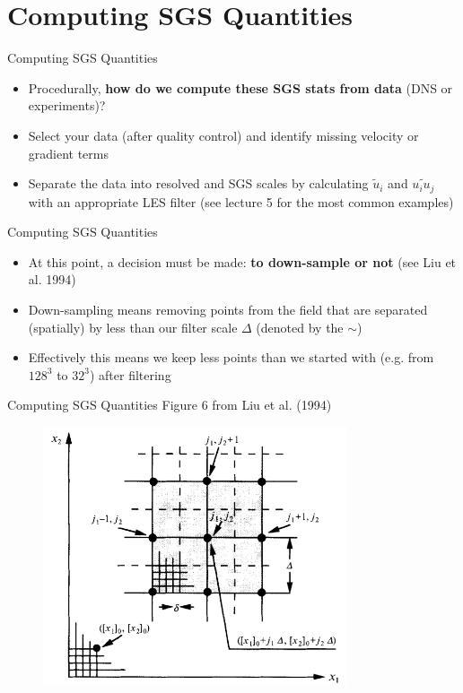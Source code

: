\section{Computing SGS Quantities}
\begin{frame}{Computing SGS Quantities}
\begin{itemize}
	\item Procedurally, \textbf{how do we compute these SGS stats from data} (DNS or experiments)?
	\item  Select your data (after quality control) and identify missing velocity or gradient terms
	\item Separate the data into resolved and SGS scales by calculating $\tilde{u}_i$ and $\widetilde{u_iu_j}$ with an appropriate LES filter (see lecture 5 for the most common examples)
\end{itemize}
\end{frame}
\begin{frame}{Computing SGS Quantities}
\begin{itemize}
	\item At this point, a decision must be made: \textbf{to down-sample or not} (see Liu et al. 1994)
	\item Down-sampling means removing points from the field that are separated (spatially) by less than our filter scale $\Delta$ (denoted by the $\sim$)
	\item Effectively this means we keep less points than we started with (e.g. from $128^3$ to $32^3$) after filtering
\end{itemize}
\end{frame}
\begin{frame}{Computing SGS Quantities}
Figure 6 from Liu et al. (1994)
\begin{figure}
	\includegraphics[width=0.8\textwidth]{apriori2}	
\end{figure}
\end{frame}

